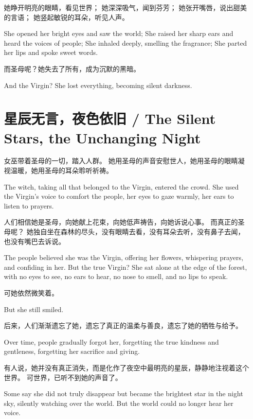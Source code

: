 她睁开明亮的眼睛，看见世界；   
她深深吸气，闻到芬芳；  
她张开嘴唇，说出甜美的言语；
她竖起敏锐的耳朵，听见人声。 
\begin{flushright}
She opened her bright eyes and saw the world;  
She raised her sharp ears and heard the voices of people;  
She inhaled deeply, smelling the fragrance;  
She parted her lips and spoke sweet words.
\end{flushright}

而圣母呢？她失去了所有，成为沉默的黑暗。  
\begin{flushright}
And the Virgin? She lost everything, becoming silent darkness.
\end{flushright}

\section*{星辰无言，夜色依旧 / The Silent Stars, the Unchanging Night}

女巫带着圣母的一切，踏入人群。  
她用圣母的声音安慰世人，她用圣母的眼睛凝视温暖，她用圣母的耳朵聆听祈祷。  
\begin{flushright}
The witch, taking all that belonged to the Virgin, entered the crowd.  
She used the Virgin's voice to comfort the people, her eyes to gaze warmly, her ears to listen to prayers.
\end{flushright}

人们相信她是圣母，向她献上花束，向她低声祷告，向她诉说心事。  
而真正的圣母呢？  
她独自坐在森林的尽头，没有眼睛去看，没有耳朵去听，没有鼻子去闻，也没有嘴巴去诉说。  
\begin{flushright}
The people believed she was the Virgin, offering her flowers, whispering prayers, and confiding in her.  
But the true Virgin?  
She sat alone at the edge of the forest, with no eyes to see, no ears to hear, no nose to smell, and no lips to speak.
\end{flushright}

可她依然微笑着。  
\begin{flushright}
But she still smiled.
\end{flushright}

后来，人们渐渐遗忘了她，遗忘了真正的温柔与善良，遗忘了她的牺牲与给予。  
\begin{flushright}
Over time, people gradually forgot her, forgetting the true kindness and gentleness, forgetting her sacrifice and giving.
\end{flushright}

有人说，她并没有真正消失，而是化作了夜空中最明亮的星辰，静静地注视着这个世界。  
可世界，已听不到她的声音了。  
\begin{flushright}
Some say she did not truly disappear but became the brightest star in the night sky, silently watching over the world.  
But the world could no longer hear her voice.
\end{flushright}
